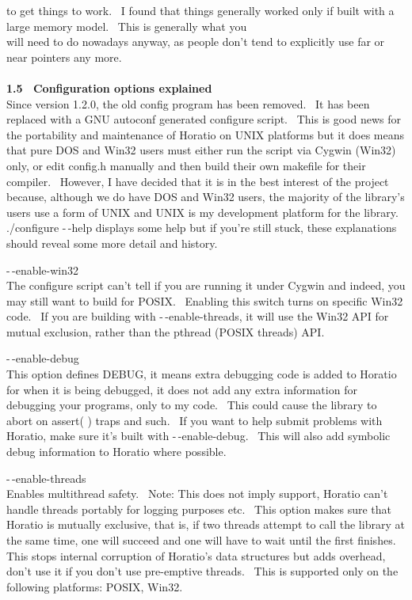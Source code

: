 \documentclass{article}
\begin{document}
to get things to work.~ I found that things generally worked only
if built with a large memory model.~ This is generally what you\\
will need to do nowadays anyway, as people don't tend to explicitly use
far or near pointers any more.\\
\\
\textbf{1.5~ Configuration options explained}
\\
Since version 1.2.0, the old config program has been removed.~ It
has been replaced with a GNU autoconf generated configure script.~
This is good news for the portability and maintenance of Horatio on
UNIX platforms but it does means that pure DOS and Win32 users must
either run the script via Cygwin (Win32) only, or edit config.h
manually and then build their own makefile for their compiler.~
However, I have decided that it is in the best interest of the project
because, although we do have DOS and Win32 users, the majority of the
library's users use a form of UNIX and UNIX is my development platform
for the library.\\
./configure -$\,$-help displays some help but if you're still stuck, these
explanations
should reveal some more detail and history.
\par -$\,$-enable-win32\\
The configure script can't tell if you are running it under Cygwin and
indeed, you may still want to build for POSIX.~ Enabling this
switch turns on specific Win32 code.~ If you are building with
-$\,$-enable-threads, it will use the Win32 API for mutual exclusion,
rather than the pthread (POSIX threads) API.\\

\par -$\,$-enable-debug
\\
This option defines DEBUG, it means extra debugging code is added to
Horatio for when it is being debugged, it does not add any extra
information
for debugging your programs, only to my code.~ This could cause
the
library to abort on assert( ) traps and such.~ If you want to help
submit problems with Horatio, make sure it's built with
-$\,$-enable-debug.~
This will also add symbolic debug information to Horatio where
possible.\\

\par -$\,$-enable-threads
\\
Enables multithread safety.~ Note: This does not imply support,
Horatio can't handle threads portably for logging purposes etc.~
This option makes sure that Horatio is mutually exclusive, that is, if
two threads attempt to call the library at the same time, one will
succeed
and one will have to wait until the first finishes.~ This stops
internal
corruption of Horatio's data structures but adds overhead, don't use
it
if you don't use pre-emptive threads.~ This is supported only on
the
following platforms: POSIX, Win32.\\
\end{document}
